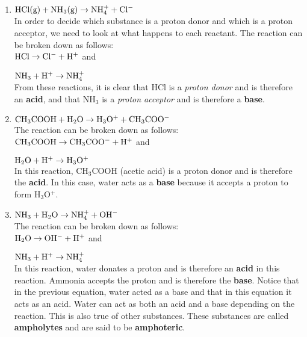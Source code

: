 \begin{enumerate}
\item{$\rm{HCl(g) + NH_{3}(g) \rightarrow NH_{4}^{+} + Cl^{-}}$\\

In order to decide which substance is a proton donor and which is a proton acceptor, we need to look at what happens to each reactant. The reaction can be broken down as follows:\\

$\rm{HCl \rightarrow Cl^{-} + H^{+}}$ and

$\rm{NH_{3} + H^{+} \rightarrow NH_{4}^{+}}$\\

From these reactions, it is clear that HCl is a \textit{proton donor} and is therefore an \textbf{acid}, and that NH$_{3}$ is a \textit{proton acceptor} and is therefore a \textbf{base}.
}

\item{$\rm{CH_{3}COOH + H_{2}O \rightarrow H_{3}O^{+} + CH_{3}COO^{-}}$\\

The reaction can be broken down as follows:\\

$\rm{CH_{3}COOH \rightarrow CH_{3}COO^{-} + H^{+}}$ and

$\rm{H_{2}O + H^{+} \rightarrow H_{3}O^{+}}$\\

In this reaction, CH$_{3}$COOH (acetic acid) is a proton donor and is therefore the \textbf{acid}. In this case, water acts as a \textbf{base} because it accepts a proton to form H$_{3}$O$^{+}$.
}

\item{$\rm{NH_{3} + H_{2}O \rightarrow NH_{4}^{+} + OH^{-}}$\\

The reaction can be broken down as follows:\\

$\rm{H_{2}O \rightarrow OH^{-} + H^{+}}$ and

$\rm{NH_{3} + H^{+} \rightarrow NH_{4}^{+}}$\\

In this reaction, water donates a proton and is therefore an \textbf{acid} in this reaction. Ammonia accepts the proton and is therefore the \textbf{base}. Notice that in the previous equation, water acted as a base and that in this equation it acts as an acid. Water can act as both an acid and a base depending on the reaction. This is also true of other substances. These substances are called \textbf{ampholytes} and are said to be \textbf{amphoteric}.}
\end{enumerate}

